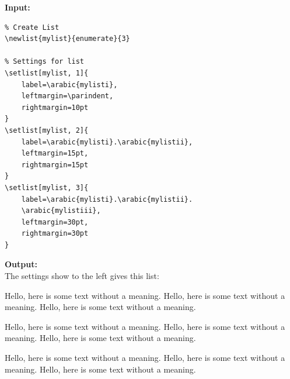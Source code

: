 \documentclass{article}
\newcommand{\randomtext}{Hello, here is some text without a meaning. Hello, here is some text without a meaning. Hello, here is some text without a meaning.} %
\begin{document}
\begin{multicols}{2}
\textbf{Input:} \\
\begin{verbatim}
% Create List
\newlist{mylist}{enumerate}{3}

% Settings for list
\setlist[mylist, 1]{
    label=\arabic{mylisti},
    leftmargin=\parindent,
    rightmargin=10pt
}
\setlist[mylist, 2]{
    label=\arabic{mylisti}.\arabic{mylistii},
    leftmargin=15pt,
    rightmargin=15pt
}
\setlist[mylist, 3]{
    label=\arabic{mylisti}.\arabic{mylistii}.
    \arabic{mylistiii},
    leftmargin=30pt,
    rightmargin=30pt
}
\end{verbatim}
 \newcolumn

    \begin{minipage}{\linewidth}
        \textbf{Output:} \\
        The settings show to the left gives this list:

        \begin{mylist}
        \item \randomtext
        \begin{mylist}
            \item \randomtext
            \begin{mylist}
                \item \randomtext
            \end{mylist}
        \end{mylist}
        \end{mylist}
    \end{minipage}
\end{multicols} %
\end{document}
